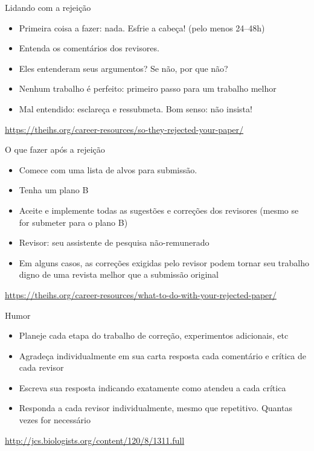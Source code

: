 \documentclass{beamer}
\begin{document}
\begin{frame}{Lidando com a rejeição}
  \begin{itemize}
    \footnotesize
  \item Primeira coisa a fazer: nada. Esfrie a cabeça! (pelo menos 24--48h)
    \medskip
  \item Entenda os comentários dos revisores.
    \medskip
  \item Eles entenderam seus argumentos? Se não, por que não?
    \medskip
  \item Nenhum trabalho é perfeito: primeiro passo para um trabalho
    melhor
    \medskip
  \item Mal entendido: esclareça e ressubmeta. Bom senso: não insista!
  \end{itemize}

  \vfill
  \tiny
  \hfill \url{https://theihs.org/career-resources/so-they-rejected-your-paper/}
\end{frame}

\begin{frame}{O que fazer após a rejeição}
  \begin{itemize}
    \footnotesize
  \item Comece com uma lista de alvos para submissão.
    \medskip
  \item Tenha um plano B
    \medskip
  \item Aceite e implemente todas as sugestões e correções dos
    revisores (mesmo se for submeter para o plano B)
    \medskip
  \item Revisor: seu assistente de pesquisa não-remunerado
    \medskip
  \item Em alguns casos, as correções exigidas pelo revisor podem
    tornar seu trabalho digno de uma revista melhor que a submissão original
  \end{itemize}

  \vfill
  \tiny
  \hfill \url{https://theihs.org/career-resources/what-to-do-with-your-rejected-paper/}
\end{frame}

\begin{frame}{Humor}
  \begin{itemize}
    \footnotesize
  \item Planeje cada etapa do trabalho de correção, experimentos
    adicionais, etc
    \medskip
  \item Agradeça individualmente em sua carta resposta cada comentário
    e crítica de cada revisor
    \medskip
  \item Escreva sua resposta indicando exatamente \alert{como} atendeu
    a \alert{cada} crítica
    \medskip
  \item Responda a cada revisor individualmente, mesmo que
    repetitivo. Quantas vezes for necessário
  \end{itemize}

  \vfill
  \tiny
  \hfill \url{http://jcs.biologists.org/content/120/8/1311.full}
\end{frame}
\end{document}
